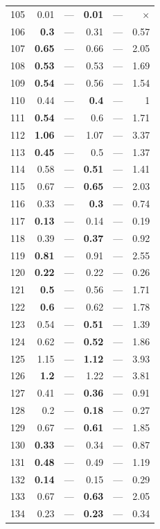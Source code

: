\begin{longtable}{lr@{\hskip 4pt}l@{\hskip 12pt}r@{\hskip 4pt}l@{\hskip 12pt}r}
105 & 0.01 & --- & \textbf{0.01} & --- & $\times$ \\
106 & \textbf{0.3} & --- & 0.31 & --- & 0.57 \\
107 & \textbf{0.65} & --- & 0.66 & --- & 2.05 \\
108 & \textbf{0.53} & --- & 0.53 & --- & 1.69 \\
109 & \textbf{0.54} & --- & 0.56 & --- & 1.54 \\
110 & 0.44 & --- & \textbf{0.4} & --- & 1 \\
111 & \textbf{0.54} & --- & 0.6 & --- & 1.71 \\
112 & \textbf{1.06} & --- & 1.07 & --- & 3.37 \\
113 & \textbf{0.45} & --- & 0.5 & --- & 1.37 \\
114 & 0.58 & --- & \textbf{0.51} & --- & 1.41 \\
115 & 0.67 & --- & \textbf{0.65} & --- & 2.03 \\
116 & 0.33 & --- & \textbf{0.3} & --- & 0.74 \\
117 & \textbf{0.13} & --- & 0.14 & --- & 0.19 \\
118 & 0.39 & --- & \textbf{0.37} & --- & 0.92 \\
119 & \textbf{0.81} & --- & 0.91 & --- & 2.55 \\
120 & \textbf{0.22} & --- & 0.22 & --- & 0.26 \\
121 & \textbf{0.5} & --- & 0.56 & --- & 1.71 \\
122 & \textbf{0.6} & --- & 0.62 & --- & 1.78 \\
123 & 0.54 & --- & \textbf{0.51} & --- & 1.39 \\
124 & 0.62 & --- & \textbf{0.52} & --- & 1.86 \\
125 & 1.15 & --- & \textbf{1.12} & --- & 3.93 \\
126 & \textbf{1.2} & --- & 1.22 & --- & 3.81 \\
127 & 0.41 & --- & \textbf{0.36} & --- & 0.91 \\
128 & 0.2 & --- & \textbf{0.18} & --- & 0.27 \\
129 & 0.67 & --- & \textbf{0.61} & --- & 1.85 \\
130 & \textbf{0.33} & --- & 0.34 & --- & 0.87 \\
131 & \textbf{0.48} & --- & 0.49 & --- & 1.19 \\
132 & \textbf{0.14} & --- & 0.15 & --- & 0.29 \\
133 & 0.67 & --- & \textbf{0.63} & --- & 2.05 \\
134 & 0.23 & --- & \textbf{0.23} & --- & 0.34 \\

\end{longtable}

